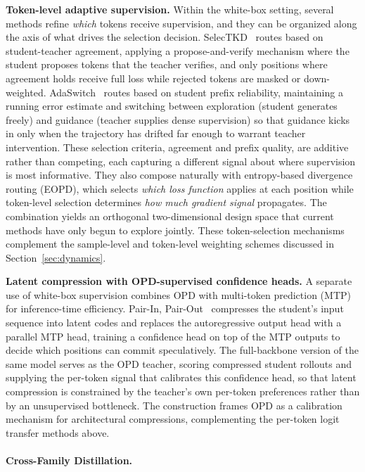 \documentclass{article} %
\begin{document}
\textbf{Token-level adaptive supervision.} Within the white-box setting, several methods refine \emph{which} tokens receive supervision, and they can be organized along the axis of what drives the selection decision. SelecTKD~\citep{2510.24021} routes based on student-teacher agreement, applying a propose-and-verify mechanism where the student proposes tokens that the teacher verifies, and only positions where agreement holds receive full loss while rejected tokens are masked or down-weighted. AdaSwitch~\citep{2510.07842} routes based on student prefix reliability, maintaining a running error estimate and switching between exploration (student generates freely) and guidance (teacher supplies dense supervision) so that guidance kicks in only when the trajectory has drifted far enough to warrant teacher intervention. These selection criteria, agreement and prefix quality, are additive rather than competing, each capturing a different signal about where supervision is most informative. They also compose naturally with entropy-based divergence routing (EOPD), which selects \emph{which loss function} applies at each position while token-level selection determines \emph{how much gradient signal} propagates. The combination yields an orthogonal two-dimensional design space that current methods have only begun to explore jointly. These token-selection mechanisms complement the sample-level and token-level weighting schemes discussed in Section~\ref{sec:dynamics}.

\textbf{Latent compression with OPD-supervised confidence heads.} A separate use of white-box supervision combines OPD with multi-token prediction (MTP) for inference-time efficiency. Pair-In, Pair-Out~\citep{2605.27255} compresses the student's input sequence into latent codes and replaces the autoregressive output head with a parallel MTP head, training a confidence head on top of the MTP outputs to decide which positions can commit speculatively. The full-backbone version of the same model serves as the OPD teacher, scoring compressed student rollouts and supplying the per-token signal that calibrates this confidence head, so that latent compression is constrained by the teacher's own per-token preferences rather than by an unsupervised bottleneck. The construction frames OPD as a calibration mechanism for architectural compressions, complementing the per-token logit transfer methods above.

\paragraph{Cross-Family Distillation.}
\label{subsubsec:cross_family}
\end{document}

